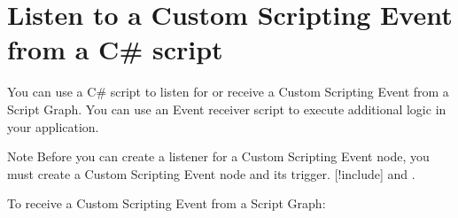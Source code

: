 \chapter{Listen to a Custom Scripting Event from a C\# script}
\hypertarget{md__hey_tea_9_2_library_2_package_cache_2com_8unity_8visualscripting_0d1_88_80_2_documentation_05ae8897d6ebd57729a6428a0e93cf56a}{}\label{md__hey_tea_9_2_library_2_package_cache_2com_8unity_8visualscripting_0d1_88_80_2_documentation_05ae8897d6ebd57729a6428a0e93cf56a}
\label{md__hey_tea_9_2_library_2_package_cache_2com_8unity_8visualscripting_0d1_88_80_2_documentation_05ae8897d6ebd57729a6428a0e93cf56a_autotoc_md5281}%
%
 You can use a C\# script to listen for or receive a Custom Scripting Event from a Script Graph. You can use an Event receiver script to execute additional logic in your application.

\begin{DoxyNote}{Note}
Before you can create a listener for a Custom Scripting Event node, you must create a Custom Scripting Event node and its trigger. \mbox{[}!include\mbox{]} and .
\end{DoxyNote}
To receive a Custom Scripting Event from a Script Graph\+:


